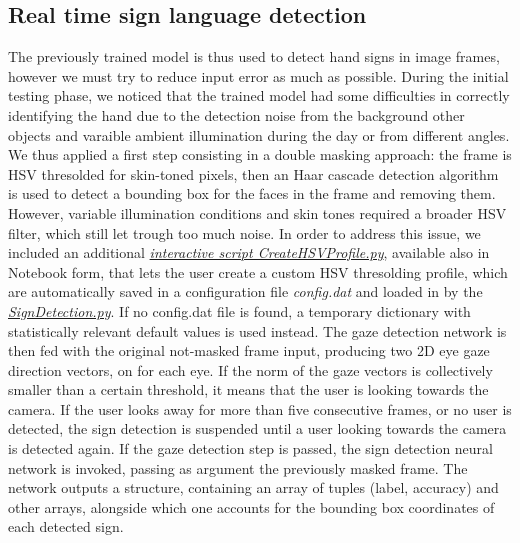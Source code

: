 \documentclass[a4paper, 12pt]{article}
\begin{document}
\subsection{Real time sign language detection}
\label{RTSignDetect}
The previously trained model is thus used to detect hand signs in image frames, however we must try to reduce input error as much as possible.
During the initial testing phase, we noticed that the trained model had some difficulties in correctly identifying the hand due to the detection noise from the background other objects and varaible ambient illumination during the day or from different angles. We thus applied a first step consisting in a double masking approach: the frame is HSV thresolded for skin-toned pixels, then an Haar cascade detection algorithm is used to detect a bounding box for the faces in the frame and removing them.\linebreak
However, variable illumination conditions and skin tones required a broader HSV filter, which still let trough too much noise. In order to address this issue, we included an additional \textit{\hyperref[https://github.com/MarzioVallero/Real-time-Sign-Language-Detection/blob/master/CreateHSVProfile.py]{interactive script CreateHSVProfile.py}}, available also in Notebook form, that lets the user create a custom HSV thresolding profile, which are automatically saved in a configuration file \textit{config.dat} and loaded in by the \textit{\hyperref[https://github.com/MarzioVallero/Real-time-Sign-Language-Detection/blob/master/SignDetection.py]{SignDetection.py}}. If no config.dat file is found, a temporary dictionary with statistically relevant default values is used instead.\linebreak
The gaze detection network is then fed with the original not-masked frame input, producing two 2D eye gaze direction vectors, on for each eye. If the norm of the gaze vectors is collectively smaller than a certain threshold, it means that the user is looking towards the camera. If the user looks away for more than five consecutive frames, or no user is detected, the sign detection is suspended until a user looking towards the camera is detected again.\linebreak
If the gaze detection step is passed, the sign detection neural network is invoked, passing as argument the previously masked frame. The network outputs a structure, containing an array of tuples (label, accuracy) and other arrays, alongside which one accounts for the bounding box coordinates of each detected sign.\linebreak
\end{document}

